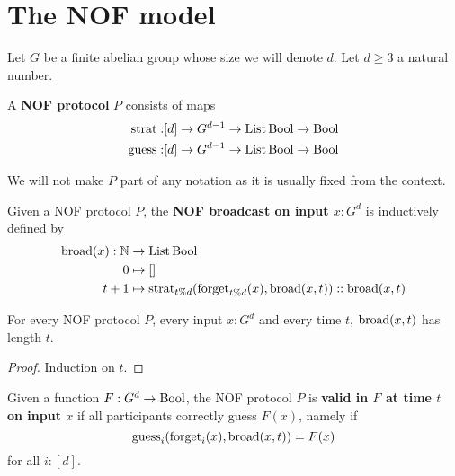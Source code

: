 \chapter{The NOF model}

Let $G$ be a finite abelian group whose size we will denote $d$. Let $d \ge 3$ a natural number.

\begin{definition}
  \label{def:protocol}
  \leanok

  A {\bf NOF protocol} $P$ consists of maps
  \begin{align}
    \operatorname{strat} : & [d] \to G^{d - 1} \to \operatorname{List} \operatorname{Bool} \to \operatorname{Bool} \\
    \operatorname{guess} : & [d] \to G^{d - 1} \to \operatorname{List} \operatorname{Bool} \to \operatorname{Bool}
  \end{align}
\end{definition}

We will not make $P$ part of any notation as it is usually fixed from the context.

\begin{definition}
  \label{def:broadcast}
  \leanok

  Given a NOF protocol $P$, the {\bf NOF broadcast on input $x : G^d$} is inductively defined by
  \begin{align}
    \operatorname{broad}(x) : \mathbb{N} & \to \operatorname{List} \operatorname{Bool} \\
    0 & \mapsto [] \\
    t + 1 & \mapsto \operatorname{strat}_{t \% d}(\operatorname{forget}_{t \% d}(x), \operatorname{broad}(x, t)) :: \operatorname{broad}(x, t)
  \end{align}
\end{definition}

\begin{lemma}
  \label{lem:length-broadcast}
  \leanok
  For every NOF protocol $P$, every input $x : G^d$ and every time $t$, $\operatorname{broad}(x, t)$ has length $t$.
\end{lemma}
\begin{proof}
  \uses{}
  \leanok
  Induction on $t$.
\end{proof}

\begin{definition}
  \label{def:valid-protocol}
  \leanok

  Given a function $F : G^d \to \operatorname{Bool}$, the NOF protocol $P$ is {\bf valid in $F$ at time $t$ on input $x$} if all participants correctly guess $F(x)$, namely if
  $$\operatorname{guess}_i(\operatorname{forget}_i(x), \operatorname{broad}(x, t)) = F(x)$$
  for all $i : [d]$.
\end{definition}

